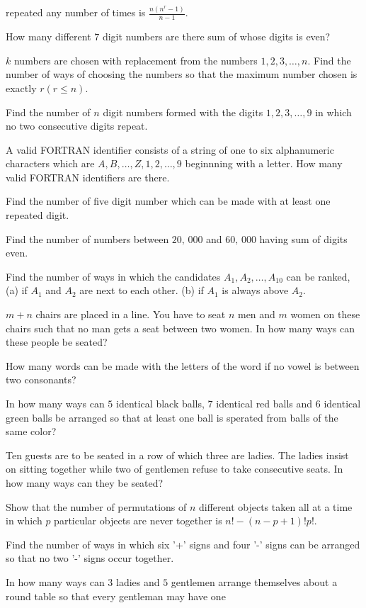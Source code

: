   repeated any number of times is $\frac{n(n^r - 1)}{n - 1}$.
\item How many different $7$ digit numbers are there sum of whose digits is even?
\item $k$ numbers are chosen with replacement from the numbers $1, 2, 3, \ldots, n$. Find the number of ways of choosing the
  numbers so that the maximum number chosen is exactly $r (r\leq n)$.
\item Find the number of $n$ digit numbers formed with the digits $1, 2, 3, \ldots, 9$ in which no two consecutive digits repeat.
\item A valid FORTRAN identifier consists of a string of one to six alphanumeric characters which are $A, B, \ldots, Z, 1, 2,
  \ldots, 9$ beginnning with a letter. How many valid FORTRAN identifiers are there.
\item Find the number of five digit number which can be made with at least one repeated digit.
\item Find the number of numbers between $20,\,000$ and $60,\,000$ having sum of digits even.
\item Find the number of ways in which the candidates $A_1, A_2, \ldots, A_{10}$ can be ranked, (a) if $A_1$ and $A_2$ are next to
  each other. (b) if $A_1$ is always above $A_2$.
\item $m + n$ chairs are placed in a line. You have to seat $n$ men and $m$ women on these chairs such that no man gets a seat
  between two women. In how many ways can these people be seated?
\item How many words can be made with the letters of the word  if no vowel is between two consonants?
\item In how many ways can $5$ identical black balls, $7$ identical red balls and $6$ identical green balls be arranged so that at
  least one ball is sperated from balls of the same color?
\item Ten guests are to be seated in a row of which three are ladies. The ladies insist on sitting together while two of gentlemen
  refuse to take consecutive seats. In how many ways can they be seated?
\item Show that the number of permutations of $n$ different objects taken all at a time in which $p$ particular objects are never
  together is $n! - (n - p + 1)!p!$.
\item Find the number of ways in which six '+' signs and four '-' signs can be arranged so that no two '-' signs occur together.
\item In how many ways can $3$ ladies and $5$ gentlemen arrange themselves about a round table so that every gentleman may have one
